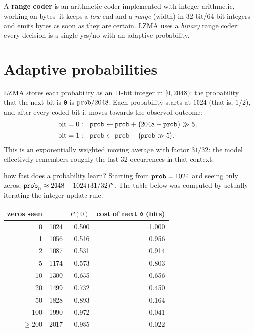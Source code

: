 \documentclass[11pt,a4paper,oneside]{book}
\newcommand{\code}[1]{\texttt{\detokenize{#1}}}
\newcommand{\bits}[1]{\texttt{#1}}
\begin{document}
A \textbf{range coder} is an arithmetic coder implemented with integer arithmetic, working on bytes: it keeps a
\emph{low} end and a \emph{range} (width) in 32-bit/64-bit integers and emits bytes as soon as they are certain. LZMA uses a
\emph{binary} range coder: every decision is a single yes/no with an adaptive probability.

\section{Adaptive probabilities}

LZMA stores each probability as an 11-bit integer \code{prob} in $[0,2048)$: the probability that the next bit is \bits{0} is
$\code{prob}/2048$. Each probability starts at $1024$ (that is, $1/2$), and after every coded bit it moves towards the observed outcome:
\begin{align*}
\text{bit}=0:&\quad \code{prob} \leftarrow \code{prob} + \big(2048-\code{prob}\big)\gg 5,\\
\text{bit}=1:&\quad \code{prob} \leftarrow \code{prob} - \big(\code{prob}\gg 5\big).
\end{align*}
This is an exponentially weighted moving average with factor $31/32$: the model effectively remembers roughly the last
32 occurrences in that context.

\begin{workedex}{how fast does a probability learn?}
Starting from $\code{prob}=1024$ and seeing only zeros, $\code{prob}_n \approx 2048-1024\,(31/32)^n$.
The table below was computed by actually iterating the integer update rule.
\begin{center}
\begin{tabular}{rrrr}
\toprule
zeros seen & \code{prob} & $P(0)$ & cost of next \bits{0} (bits)\\
\midrule
0 & 1024 & 0.500 & 1.000\\
1 & 1056 & 0.516 & 0.956\\
2 & 1087 & 0.531 & 0.914\\
5 & 1174 & 0.573 & 0.803\\
10 & 1300 & 0.635 & 0.656\\
20 & 1499 & 0.732 & 0.450\\
50 & 1828 & 0.893 & 0.164\\
100 & 1990 & 0.972 & 0.041\\
$\ge 200$ & 2017 & 0.985 & 0.022\\
\bottomrule
\end{tabular}
\end{center}
\end{workedex}
\end{document}
